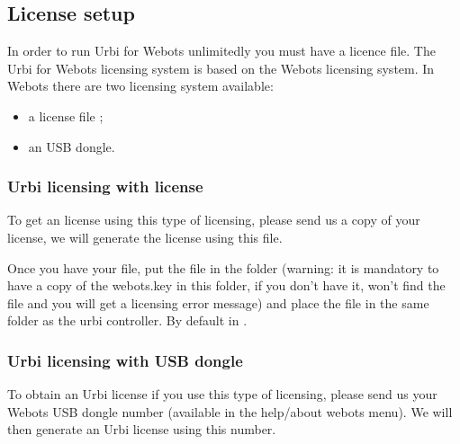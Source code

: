 

\subsection{License setup}
\label{webots.license}%

In order to run Urbi for Webots unlimitedly you must have a licence
file.  The Urbi for Webots licensing system is based on the Webots
licensing system.  In Webots there are two licensing system available:
\begin{itemize}
\item a license file ;
\item an USB dongle.
\end{itemize}

\subsubsection{Urbi licensing with  license}
\label{webots.license.webotskey}%

To get an \urbi license using this type of licensing, please send us a
copy of your  license, we will generate the \urbi
license using this file.

Once you have your  file, put the 
file in the folder  (warning: it is mandatory
to have a copy of the webots.key in this folder, if you don't have it,
\urbi won't find the  file and you will get a
licensing error message) and place the  file in the
same folder as the urbi controller. By default in
.


\subsubsection{Urbi licensing with USB dongle}
\label{webots.license.dongleusb}%

To obtain an Urbi license if you use this type of licensing, please
send us your Webots USB dongle number (available in the help/about
webots menu). We will then generate an Urbi license using this number.

